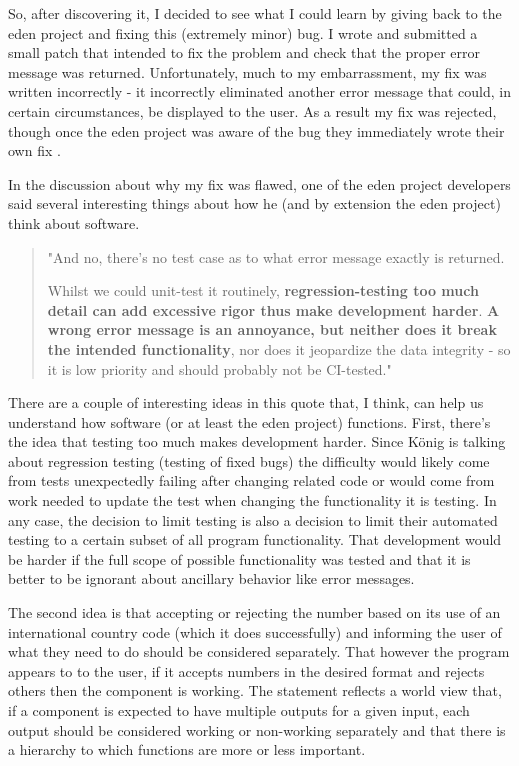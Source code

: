 \documentclass[a4paper,man,natbib,floatsintext]{apa6}
\begin{document}
   So, after discovering it, I decided to see what I could learn by giving back to the \acrshort{eden} project and fixing this (extremely minor) bug. I wrote and submitted a small patch that intended to fix the problem and check that the proper error message was returned. Unfortunately, much to my embarrassment, my fix was written incorrectly - it incorrectly eliminated another error message that could, in certain circumstances, be displayed to the user. As a result my fix was rejected, though once the \acrshort{eden} project was aware of the bug they immediately wrote their own fix \citep{Konig2020-ey}.

   In the discussion about why my fix was flawed, one of the \acrshort{eden} project developers said several interesting things about how he (and by extension the \acrshort{eden} project) think about software.

   \begin{quote}
   "And no, there's no test case as to what error message exactly is returned.

   Whilst we could unit-test it routinely, \textbf{regression-testing too much detail can add excessive rigor thus make development harder}. \textbf{A wrong error message is an annoyance, but neither does it break the intended functionality}, nor does it jeopardize the data integrity - so it is low priority and should probably not be CI-tested." \citep{Konig2020-yx}
   \end{quote}

   There are a couple of interesting ideas in this quote that, I think, can help us understand how software (or at least the \acrshort{eden} project) functions. First, there's the idea that testing too much makes development harder. Since K{\"o}nig is talking about regression testing (testing of fixed bugs) the difficulty would likely come from tests unexpectedly failing after changing related code or would come from work needed to update the test when changing the functionality it is testing. In any case, the decision to limit testing is also a decision to limit their automated testing to a certain subset of all program functionality. That development would be harder if the full scope of possible functionality was tested and that it is better to be ignorant about ancillary behavior like error messages.

   The second idea is that accepting or rejecting the number based on its use of an international country code (which it does successfully) and informing the user of what they need to do should be considered separately. That however the program appears to to the user, if it accepts numbers in the desired format and rejects others then the component is working. The statement reflects a world view that, if a component is expected to have multiple outputs for a given input, each output should be considered working or non-working separately and that there is a hierarchy to which functions are more or less important. 
\end{document}
